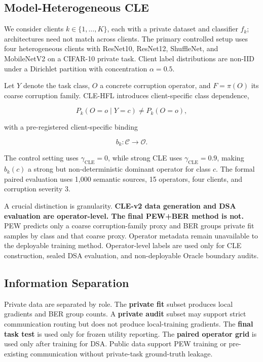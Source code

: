 \documentclass[10pt,twocolumn]{article}
\begin{document}
\subsection{Model-Heterogeneous CLE}

We consider clients \(k\in\{1,\ldots,K\}\), each with a private dataset and classifier \(f_k\); architectures need not match across clients. The primary controlled setup uses four heterogeneous clients with ResNet10, ResNet12, ShuffleNet, and MobileNetV2 on a CIFAR-10 private task. Client label distributions are non-IID under a Dirichlet partition with concentration \(\alpha=0.5\).

Let \(Y\) denote the task class, \(O\) a concrete corruption operator, and \(F=\pi(O)\) its coarse corruption family. CLE-HFL introduces client-specific class dependence,

\[
P_k(O=o\mid Y=c)\neq P_k(O=o),
\]

with a pre-registered client-specific binding

\[
b_k:\mathcal C\rightarrow\mathcal O.
\]

The control setting uses \(\gamma_{\mathrm{CLE}}=0\), while strong CLE uses \(\gamma_{\mathrm{CLE}}=0.9\), making \(b_k(c)\) a strong but non-deterministic dominant operator for class \(c\). The formal paired evaluation uses 1,000 semantic sources, 15 operators, four clients, and corruption severity 3.

A crucial distinction is granularity. \textbf{CLE-v2 data generation and DSA evaluation are operator-level. The final PEW+BER method is not.} PEW predicts only a coarse corruption-family proxy and BER groups private fit samples by class and that coarse proxy. Operator metadata remain unavailable to the deployable training method. Operator-level labels are used only for CLE construction, sealed DSA evaluation, and non-deployable Oracle boundary audits.

\subsection{Information Separation}

Private data are separated by role. The \textbf{private fit} subset produces local gradients and BER group counts. A \textbf{private audit} subset may support strict communication routing but does not produce local-training gradients. The \textbf{final task test} is used only for frozen utility reporting. The \textbf{paired operator grid} is used only after training for DSA. Public data support PEW training or pre-existing communication without private-task ground-truth leakage.
\end{document}
